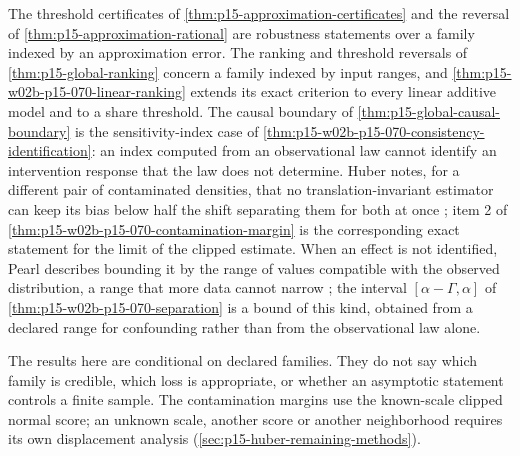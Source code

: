 The threshold certificates of
\cref{thm:p15-approximation-certificates} and the reversal of
\cref{thm:p15-approximation-rational} are robustness statements over a
family indexed by an approximation error. The ranking and threshold
reversals of \cref{thm:p15-global-ranking} concern a family indexed by
input ranges, and \cref{thm:p15-w02b-p15-070-linear-ranking} extends its
exact criterion to every linear additive model and to a share threshold.
The causal boundary of \cref{thm:p15-global-causal-boundary} is the
sensitivity-index case of
\cref{thm:p15-w02b-p15-070-consistency-identification}: an index computed
from an observational law cannot identify an intervention response that
the law does not determine.
Huber notes, for a different pair of contaminated densities, that no
translation-invariant estimator can keep its bias below half the shift
separating them for both at once \cite[Sec.~7, p.~83]{Huber1964RobustLocation};
item 2 of \cref{thm:p15-w02b-p15-070-contamination-margin} is the
corresponding exact statement for the limit of the clipped estimate.
When an effect is not identified, Pearl describes bounding it by the range
of values compatible with the observed distribution, a range that more data
cannot narrow \cite[Sec.~3.5.3, p.~124]{Pearl2009CausalOverview}; the
interval \([\alpha-\Gamma,\alpha]\) of
\cref{thm:p15-w02b-p15-070-separation} is a bound of this kind, obtained
from a declared range for confounding rather than from the observational
law alone.

The results here are conditional on declared families. They do not say
which family is credible, which loss is appropriate, or whether an
asymptotic statement controls a finite sample. The contamination margins
use the known-scale clipped normal score; an unknown scale, another score
or another neighborhood requires its own displacement analysis
(\cref{sec:p15-huber-remaining-methods}).

